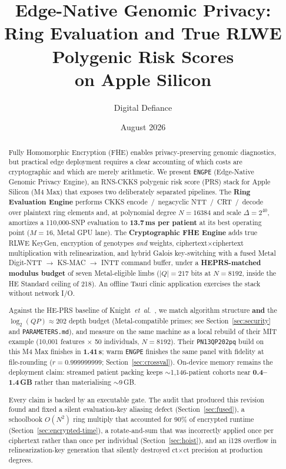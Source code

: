 \documentclass[11pt,a4paper]{article}
\title{%
  Edge-Native Genomic Privacy:\\
  Ring Evaluation and True RLWE Polygenic Risk Scores\\
  on Apple Silicon}
\author{Digital Defiance}
\date{August 2026}
\newcommand{\engpe}{\texttt{ENGPE}}
\DeclareRobustCommand{\code}[1]{\texttt{#1}}
\DeclareRobustCommand{\file}[1]{\texttt{#1}}
\begin{document}
\maketitle

\begin{abstract}
Fully Homomorphic Encryption (FHE) enables privacy-preserving genomic diagnostics,
but practical edge deployment requires a clear accounting of which costs are
cryptographic and which are merely arithmetic. We present \engpe{} (Edge-Native
Genomic Privacy Engine), an RNS-CKKS polygenic risk score (PRS) stack for Apple
Silicon (M4 Max) that exposes two deliberately separated pipelines. The
\textbf{Ring Evaluation Engine} performs CKKS encode~/~negacyclic NTT~/~CRT~/~decode
over plaintext ring elements and, at polynomial degree $N = 16384$ and scale
$\Delta = 2^{40}$, amortizes a 110{,}000-SNP evaluation to \textbf{13.7\,ms per
patient} at its best operating point ($M = 16$, Metal GPU lane). The
\textbf{Cryptographic FHE Engine} adds true RLWE KeyGen, encryption of genotypes
\textit{and} weights, ciphertext$\times$ciphertext multiplication with
relinearization, and hybrid Galois key-switching with a fused Metal Digit-NTT
$\to$ KS-MAC $\to$ INTT command buffer, under a \textbf{HEPRS-matched modulus
budget} of seven Metal-eligible limbs ($|Q| = 217$ bits at $N = 8192$, inside the
HE Standard ceiling of 218). An offline Tauri clinic application exercises the
stack without network I/O.

Against the HE-PRS baseline of Knight~\textit{et~al.}~\cite{knight2026heprs}, we
match algorithm structure \textbf{and} the $\log_2(QP)\approx 202$ depth budget
(Metal-compatible primes; see Section~\ref{sec:security} and
\file{PARAMETERS.md}), and measure on the same machine as a local rebuild of their
MIT example (10{,}001 features $\times$ 50 individuals, $N = 8192$). Their
\code{PN13QP202pq} build on this M4 Max finishes in \textbf{1.41\,s}; warm
\engpe{} finishes the same panel with fidelity at file-rounding
($r = 0.999999999$; Section~\ref{sec:crossval}). On-device memory remains the
deployment claim: streamed patient packing keeps $\sim$1{,}146-patient cohorts near
\textbf{0.4--1.4\,GB} rather than materialising $\sim$9\,GB.

Every claim is backed by an executable gate. The audit that produced this revision
found and fixed a silent evaluation-key aliasing defect
(Section~\ref{sec:fused}), a schoolbook $O(N^2)$ ring multiply that accounted for
90\% of encrypted runtime (Section~\ref{sec:encrypted-time}), a rotate-and-sum that
was incorrectly applied once per ciphertext rather than once per individual
(Section~\ref{sec:hoist}), and an i128 overflow in relinearization-key generation
that silently destroyed ct$\times$ct precision at production degrees.
\end{abstract}
\end{document}

